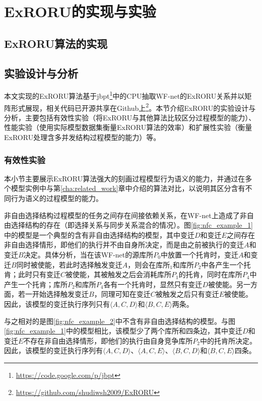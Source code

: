 \chapter{ExRORU的实现与实验}\label{cha:experiment}

\section{ExRORU算法的实现}\label{sec:implementation}

\section{实验设计与分析}\label{sec:experiment}
本文实现的ExRORU算法基于jbpt\footnote{\url{https://code.google.com/p/jbpt}}中的CPU抽取WF-net的ExRORU关系并以矩阵形式展现，相关代码已开源共享在Github上\footnote{\url{https://github.com/shudiwsh2009/ExRORU}}。本节介绍ExRORU的实验设计与分析，主要包括有效性实验（将ExRORU与其他算法比较区分过程模型的能力）、性能实验（使用实际模型数据集衡量ExRORU算法的效率）和扩展性实验（衡量ExRORU处理含多并发结构过程模型的能力）等。

\subsection{有效性实验}\label{subsec:effectiveness}
本小节主要展示ExRORU算法强大的刻画过程模型行为语义的能力，并通过在多个模型实例中与第\ref{cha:related_work}章中介绍的算法对比，以说明其区分含有不同行为语义的过程模型的能力。

{\heiti 非自由选择结构\qquad}过程模型的任务之间存在间接依赖关系\cite{van2004workflow,van2003workflow,de2003workflow,van2004process}，在WF-net上造成了非自由选择结构的存在（即选择关系与同步关系混合的情况）。图\ref{fig:nfc_example_1}中的模型是一个典型的含有非自由选择结构的模型，其中变迁$D$和变迁$E$之间存在非自由选择情形，即他们的执行并不由自身所决定，而是由之前被执行的变迁$A$和变迁$B$决定。具体分析，当在该WF-net的源库所$P_{0}$中放置一个托肯时，变迁$A$和变迁$B$同时被使能，若此时选择触发变迁$A$，则会在库所$_{1}$和库所$P_{2}$中各产生一个托肯；此时只有变迁$C$被使能，其被触发之后会消耗库所$P_{1}$的托肯，同时在库所$P_{4}$中产生一个托肯；库所$P_{2}$和库所$P_{4}$各有一个托肯时，显然只有变迁$D$被使能。另一方面，若一开始选择触发变迁$B$，同理可知在变迁$C$被触发之后只有变迁$E$被使能。因此，该模型的变迁执行序列只有$\langle A,C,D\rangle$和$\langle B,C,E\rangle$两条。

与之相对的是图\ref{fig:nfc_example_2}中不含有非自由选择结构的模型。与图\ref{fig:nfc_example_1}中的模型相比，该模型少了两个库所和四条边，其中变迁$D$和变迁$E$不存在非自由选择情形，即他们的执行由自身竞争库所$P_{2}$中的托肯所决定。因此，该模型的变迁执行序列有$\langle A,C,D\rangle$、$\langle A,C,E\rangle$、$\langle B,C,D\rangle$和$\langle B,C,E\rangle$四条。

